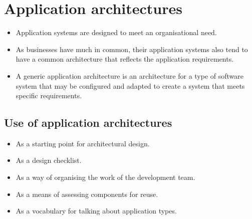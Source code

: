 \section{Application architectures}
\begin{itemize}
\item Application systems are designed to meet an organisational need.

\item As businesses have much in common, their application systems also tend to have a common architecture that reflects the application requirements.

\item A generic application architecture is an architecture for a type of software system that may be configured and adapted to create a system that meets specific requirements.

\end{itemize}
\subsection{Use of application architectures}
\begin{itemize}
\item As a starting point for architectural design. \item As a design checklist.
\item As a way of organising the work of the development team. \item As a means of assessing components for reuse.
\item As a vocabulary for talking about application types.

\end{itemize}
